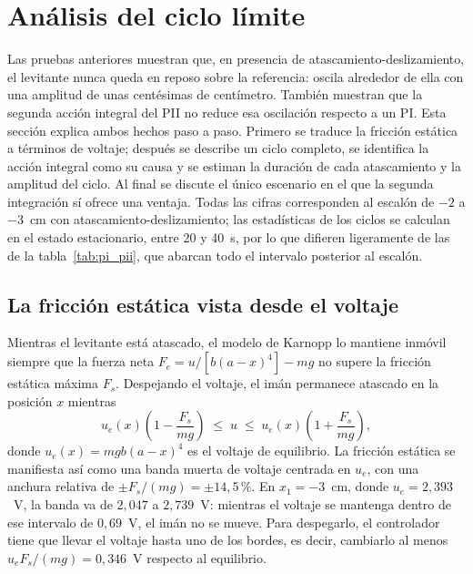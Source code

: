 \section{Análisis del ciclo límite}
\label{sec:analisis_ciclo}

Las pruebas anteriores muestran que, en presencia de atascamiento-deslizamiento, el levitante nunca queda en reposo sobre la referencia: oscila alrededor de ella con una amplitud de unas centésimas de centímetro. También muestran que la segunda acción integral del PII no reduce esa oscilación respecto a un PI. Esta sección explica ambos hechos paso a paso. Primero se traduce la fricción estática a términos de voltaje; después se describe un ciclo completo, se identifica la acción integral como su causa y se estiman la duración de cada atascamiento y la amplitud del ciclo. Al final se discute el único escenario en el que la segunda integración sí ofrece una ventaja. Todas las cifras corresponden al escalón de $-2$ a $-3$~cm con atascamiento-deslizamiento; las estadísticas de los ciclos se calculan en el estado estacionario, entre 20 y 40~s, por lo que difieren ligeramente de las de la tabla~\ref{tab:pi_pii}, que abarcan todo el intervalo posterior al escalón.

\subsection{La fricción estática vista desde el voltaje}

Mientras el levitante está atascado, el modelo de Karnopp lo mantiene inmóvil siempre que la fuerza neta $F_e = u/[b(a-x)^4] - mg$ no supere la fricción estática máxima $F_s$. Despejando el voltaje, el imán permanece atascado en la posición $x$ mientras
\begin{equation}
u_e(x)\left(1-\frac{F_s}{mg}\right) \;\le\; u \;\le\; u_e(x)\left(1+\frac{F_s}{mg}\right),
\label{eq:banda_voltaje}
\end{equation}
donde $u_e(x)=mgb(a-x)^4$ es el voltaje de equilibrio. La fricción estática se manifiesta así como una banda muerta de voltaje centrada en $u_e$, con una anchura relativa de $\pm F_s/(mg)=\pm14{,}5$\,\%. En $x_1=-3$~cm, donde $u_e=2{,}393$~V, la banda va de $2{,}047$ a $2{,}739$~V: mientras el voltaje se mantenga dentro de ese intervalo de $0{,}69$~V, el imán no se mueve. Para despegarlo, el controlador tiene que llevar el voltaje hasta uno de los bordes, es decir, cambiarlo al menos $u_e F_s/(mg)=0{,}346$~V respecto al equilibrio.

